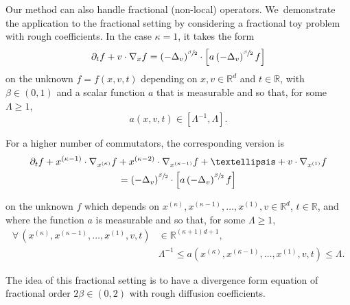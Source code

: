 \documentclass[10pt]{amsart}
\theoremstyle{definition}
\newcommand\R{{\mathbb R}}
\begin{document}
Our method can also handle fractional (non-local) operators. We~demonstrate the
application to the fractional setting by considering a fractional toy problem
with rough coefficients. In the case \(\kappa=1\), it takes the form
\begin{equation}
\label{eq:kolmo-nonloc}
\partial_t f + v \cdot \nabla_x f = \left(- \Delta_v
\right)^{\sfrac{\beta}{2}} \cdot \left[ a
\left(- \Delta_v \right)^{\sfrac{\beta}{2}} f \right]
\end{equation}
on the unknown $f=f(x,v,t)$ depending on $x,v \in \R^d$ and
$t \in \R$, with $\beta \in (0,1)$ and a scalar function $a$ that
is measurable and so that, for some $\Lambda \ge 1$,
\begin{equation}
\label{eq:ellip1-frac}
a(x,v,t) \in [\Lambda^{-1},\Lambda].
\end{equation}
\noindent
\begin{minipage}{\textwidth}
For a higher number of commutators, the corresponding version is
\begin{multline}
\label{eq:kolmo-nonloc-k}
\partial_t f + x^{(\kappa-1)} \cdot \nabla_{x^{(\kappa)}} f
+ x^{(\kappa-2)} \cdot \nabla_{x^{(\kappa-1)}} f +
\dots + v \cdot \nabla_{x^{(1)}} f\\
=
\left(- \Delta_v \right)^{\sfrac{\beta}{2}} \cdot \Bigl[ a
\left(- \Delta_v \right)^{\sfrac{\beta}{2}} f \Bigr]
\end{multline}
\end{minipage}
\par\smallskip\noindent
on the unknown $f$ which depends on
$x^{(\kappa)},x^{(\kappa-1)}, \dots, x^{(1)},v \in \R^d$,
$t \in \R$, and where the function $a$ is measurable and so that,
for some $\Lambda \ge 1$,
\begin{equation}
\begin{aligned}
\label{eq:ellipk}
\forall \, (x^{(\kappa)},x^{(\kappa-1)}, \dots, x^{(1)},v,t)
&\in \R^{(\kappa+1)d+1}, \\
&\Lambda^{-1} \le
a(x^{(\kappa)},x^{(\kappa-1)},\dots,x^{(1)},v,t) \le \Lambda.
\end{aligned}
\end{equation}

The idea of this fractional setting is to have a divergence form equation of
fractional order $2\beta \in (0, 2)$ with rough diffusion coefficients.
\end{document}
